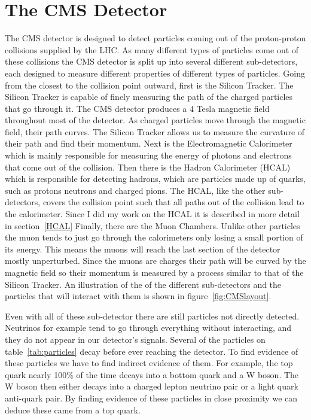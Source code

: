 \section{The CMS Detector}
The CMS detector is designed to detect particles coming out of the proton-proton collisions supplied by the LHC. As many different types of particles come out of these collisions the CMS detector is split up into several different sub-detectors, each designed to measure different properties of different types of particles. Going from the closest to the collision point outward, first is the Silicon Tracker. The Silicon Tracker is capable of finely measuring the path of the charged particles that go through it. The CMS detector produces a 4 Tesla magnetic field throughout most of the detector. As charged particles move through the magnetic field, their path curves. The Silicon Tracker allows us to measure the curvature of their path and find their momentum. Next is the Electromagnetic Calorimeter which is mainly responsible for measuring the energy of photons and electrons that come out of the collision. Then there is the Hadron Calorimeter (HCAL) which is responsible for detecting hadrons, which are particles made up of quarks, such as protons neutrons and charged pions. The HCAL, like the other sub-detectors, covers the collision point such that all paths out of the collision lead to the calorimeter. Since I did my work on the HCAL it is described in more detail in section~\ref{HCAL} Finally, there are the Muon Chambers. Unlike other particles the muon tends to just go through the calorimeters only losing a small portion of its energy. This means the muons will reach the last section of the detector mostly unperturbed. Since the muons are charges their path will be curved by the magnetic field so their momentum is measured by a process similar to that of the Silicon Tracker. An illustration of the of the different sub-detectors and the particles that will interact with them is shown in figure~\ref{fig:CMSlayout}.

Even with all of these sub-detector there are still particles not directly detected. Neutrinos for example tend to go through everything without interacting, and they do not appear in our detector's signals. Several of the particles on table~\ref{tab:particles} decay before ever reaching the detector. To find evidence of these particles we have to find indirect evidence of them. For example, the top quark nearly 100\% of the time decays into a bottom quark and a W boson. The W boson then either decays into a charged lepton neutrino pair or a light quark anti-quark pair. By finding evidence of these particles in close proximity we can deduce these came from a top quark.

